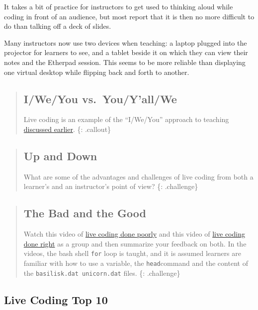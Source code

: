 It takes a bit of practice for instructors to get used to thinking aloud
while coding in front of an audience, but most report that it is then no
more difficult to do than talking off a deck of slides.

Many instructors now use two devices when teaching: a laptop plugged
into the projector for learners to see, and a tablet beside it on which
they can view their notes and the Etherpad session. This seems to be
more reliable than displaying one virtual desktop while flipping back
and forth to another.

\begin{quote}
\subsection{I/We/You vs.~You/Y'all/We}\label{iweyou-vs.youyallwe}

Live coding is an example of the ``I/We/You'' approach to teaching
\href{\{\{\%20page.root\%20\}\}/05-performance/}{discussed earlier}. \{:
.callout\}
\end{quote}

\begin{quote}
\subsection{Up and Down}\label{up-and-down-1}

What are some of the advantages and challenges of live coding from both
a learner's and an instructor's point of view? \{: .challenge\}
\end{quote}

\begin{quote}
\subsection{The Bad and the Good}\label{the-bad-and-the-good}

Watch this video of \href{https://youtu.be/bXxBeNkKmJE}{live coding done
poorly} and this video of \href{https://youtu.be/SkPmwe\_WjeY}{live
coding done right} as a group and then summarize your feedback on both.
In the videos, the bash shell \texttt{for} loop is taught, and it is
assumed learners are familiar with how to use a variable, the
\texttt{head}command and the content of the
\texttt{basilisk.dat unicorn.dat} files. \{: .challenge\}
\end{quote}

\subsection{Live Coding Top 10}\label{live-coding-top-10}

